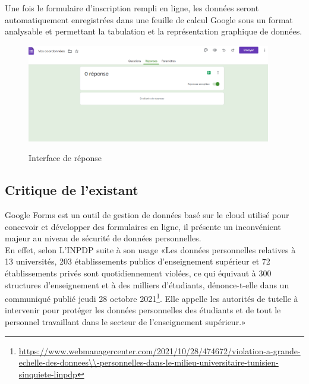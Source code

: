  Une fois le formulaire d’inscription rempli en ligne, les données seront automatiquement enregistrées dans une feuille de calcul Google sous un format analysable et permettant la tabulation et la représentation graphique de données.
\begin{figure}[!h]
	\centering
	{\includegraphics[width=0.95\textwidth]{D) IMAGES/for3.png}}
	\caption{Interface de réponse}
	\label{Org}
\end{figure}
\newpage
\subsection{Critique de l'existant}
Google Forms est un outil de gestion de données basé sur le cloud utilisé pour concevoir et développer des formulaires en ligne, il présente un inconvénient majeur au niveau de sécurité de données personnelles.\\
En effet, selon L’INPDP suite à son usage «Les données personnelles relatives à 13 universités, 203 établissements publics d’enseignement supérieur et 72 établissements privés sont quotidiennement violées, ce qui équivaut à 300 structures d’enseignement et à des milliers d’étudiants, dénonce-t-elle dans un communiqué publié jeudi 28 octobre 2021\footnote{\url{https://www.webmanagercenter.com/2021/10/28/474672/violation-a-grande-echelle-des-donnees\\-personnelles-dans-le-milieu-universitaire-tunisien-sinquiete-linpdp}}. Elle appelle les autorités de tutelle à intervenir pour protéger les données personnelles des étudiants et de tout le personnel travaillant dans le secteur de l’enseignement supérieur.»  
